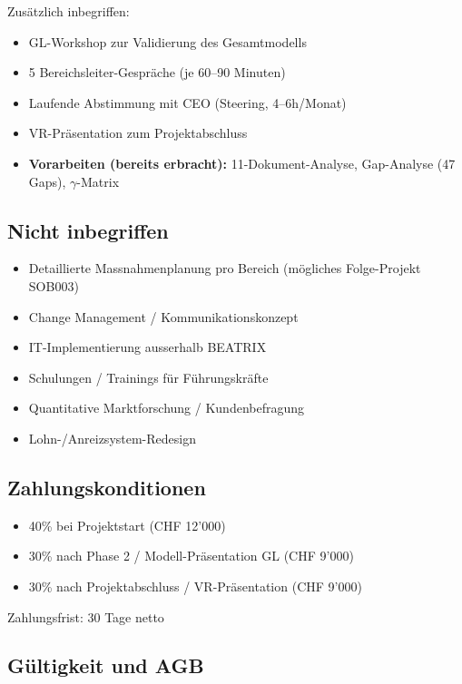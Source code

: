 \documentclass{fehradvice-report}
\begin{document}
\vspace{0.5cm}

Zusätzlich inbegriffen:
\begin{itemize}
    \item GL-Workshop zur Validierung des Gesamtmodells
    \item 5 Bereichsleiter-Gespräche (je 60--90 Minuten)
    \item Laufende Abstimmung mit CEO (Steering, 4--6h/Monat)
    \item VR-Präsentation zum Projektabschluss
    \item \textbf{Vorarbeiten (bereits erbracht):} 11-Dokument-Analyse, Gap-Analyse (47 Gaps), $\gamma$-Matrix
\end{itemize}

\subsection{Nicht inbegriffen}

\begin{itemize}
    \item Detaillierte Massnahmenplanung pro Bereich (mögliches Folge-Projekt SOB003)
    \item Change Management / Kommunikationskonzept
    \item IT-Implementierung ausserhalb BEATRIX
    \item Schulungen / Trainings für Führungskräfte
    \item Quantitative Marktforschung / Kundenbefragung
    \item Lohn-/Anreizsystem-Redesign
\end{itemize}

\subsection{Zahlungskonditionen}

\begin{itemize}
    \item 40\% bei Projektstart (CHF 12'000)
    \item 30\% nach Phase 2 / Modell-Präsentation GL (CHF 9'000)
    \item 30\% nach Projektabschluss / VR-Präsentation (CHF 9'000)
\end{itemize}

Zahlungsfrist: 30 Tage netto

\subsection{Gültigkeit und AGB}
\end{document}
